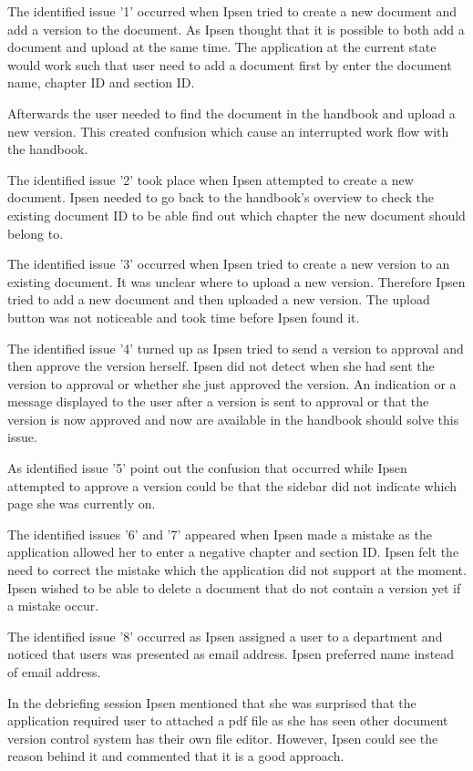 The identified issue '1' occurred when Ipsen tried to create a new document and add a version to the document. 
As Ipsen thought that it is possible to both add a document and upload at the same time. 
The application at the current state would work such that user need to add a document first by enter the document name, chapter ID and section ID. 

Afterwards the user needed to find the document in the handbook and upload a new version. 
This created confusion which cause an interrupted work flow with the handbook.

The identified issue '2' took place when Ipsen attempted to create a new document. 
Ipsen needed to go back to the handbook's overview to check the existing document ID to be able find out which chapter the new document should belong to. 

The identified issue '3' occurred when Ipsen tried to create a new version to an existing document. 
It was unclear where to upload a new version. 
Therefore Ipsen tried to add a new document and then uploaded a new version. 
The upload button was not noticeable and took time before Ipsen found it. 

The identified issue '4' turned up as Ipsen tried to send a version to approval and then  approve the version herself.
Ipsen did not detect when she had sent the version to approval or whether she just approved the version. 
An indication or a message displayed to the user after a version is sent to approval or that the version is now approved and now are available in the handbook should solve this issue.

As identified issue '5' point out the confusion that occurred while Ipsen attempted to approve a version could be that the sidebar did not indicate which page she was currently on. 

The identified issues '6' and '7' appeared when Ipsen made a mistake as the application allowed her to enter a negative chapter and section ID. 
Ipsen felt the need to correct the mistake which the application did not support at the moment.
Ipsen wished to be able to delete a document that do not contain a version yet if a mistake occur.

The identified issue '8' occurred as Ipsen assigned a user to a department and noticed that users was presented as email address.
Ipsen preferred name instead of email address.

In the debriefing session Ipsen mentioned that she was surprised that the application required user to attached a pdf file as she has seen other document version control system has their own file editor.
However, Ipsen could see the reason behind it and commented that it is a good approach.

